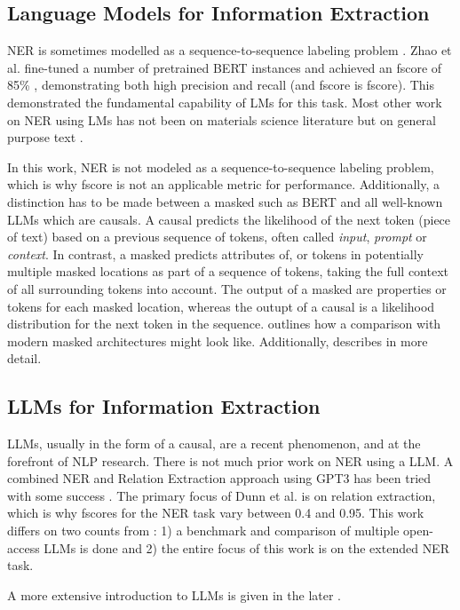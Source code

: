 \subsection{Language Models for Information Extraction}\label{sub:lmie}
\gls{NER} is sometimes modelled as a sequence-to-sequence labeling problem \cite{zhao_finetuning_2021, dunn_structured_2022}.
Zhao et al. fine-tuned a number of pretrained \gls{BERT} instances and achieved an \gls{fscore} of 85\% \cite{zhao_finetuning_2021}, demonstrating both high precision and recall (and \gls{fscore} is \glsdesc{fscore}).
This demonstrated the fundamental capability of \glspl{LM} for this task.
Most other work on \gls{NER} using \glspl{LM} has not been on materials science literature but on general purpose text \cite{li_survey_2022}.


In this work, \gls{NER} is not modeled as a sequence-to-sequence labeling problem, which is why \gls{fscore} is not an applicable metric for performance.
Additionally, a distinction has to be made between a \gls{masked} such as \gls{BERT} and all well-known \glspl{LLM} which are \glspl{causal}.
A \gls{causal} predicts the likelihood of the next token (piece of text) based on a previous sequence of tokens, often called \textit{input}, \textit{prompt} or \textit{context}.
In contrast, a \gls{masked} predicts attributes of, or tokens in potentially multiple masked locations as part of a sequence of tokens, taking the full context of all surrounding tokens into account.
The output of a \gls{masked} are properties or tokens for each masked location, whereas the outupt of a \gls{causal} is a likelihood distribution for the next token in the sequence. 
 outlines how a comparison with modern \gls{masked} architectures might look like. Additionally,  describes  in more detail.

\subsection{LLMs for Information Extraction}\label{sub:llmie}
\glspl{LLM}, usually in the form of a \gls{causal}, are a recent phenomenon, and at the forefront of \gls{NLP} research.
There is not much prior work on \gls{NER} using a \gls{LLM}.
A combined \gls{NER} and Relation Extraction approach using \gls{GPT3} has been tried with some success \cite{dunn_structured_2022}.
The primary focus of Dunn et al. \cite{dunn_structured_2022} is on relation extraction, which is why \glspl{fscore} for the \gls{NER} task vary between 0.4 and 0.95.
This work differs on two counts from \cite{dunn_structured_2022}: 1) a benchmark and comparison of multiple open-access \glspl{LLM} is done and 2) the entire focus of this work is on the extended \gls{NER} task.

A more extensive introduction to \glspl{LLM} is given in the later .

